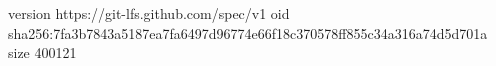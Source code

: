 version https://git-lfs.github.com/spec/v1
oid sha256:7fa3b7843a5187ea7fa6497d96774e66f18c370578ff855c34a316a74d5d701a
size 400121
